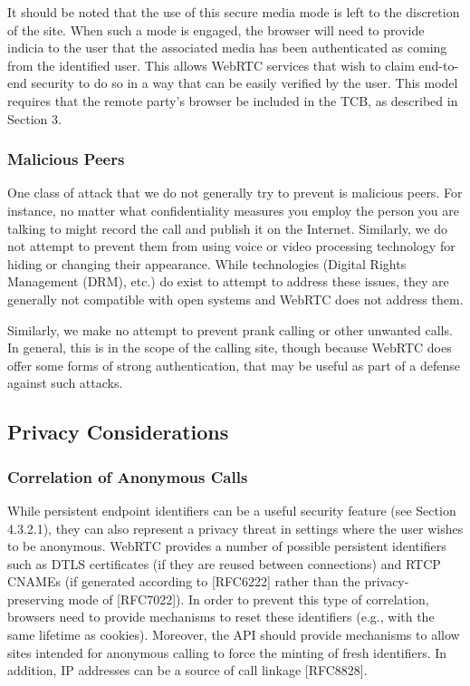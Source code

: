 \documentclass{article}
\begin{document}
It should be noted that the use of this secure media mode is left to
the discretion of the site.  When such a mode is engaged, the browser
will need to provide indicia to the user that the associated media
has been authenticated as coming from the identified user.  This
allows WebRTC services that wish to claim end-to-end security to do
so in a way that can be easily verified by the user.  This model
requires that the remote party's browser be included in the TCB, as
described in Section 3.

\subsubsection{Malicious Peers}

One class of attack that we do not generally try to prevent is
malicious peers.  For instance, no matter what confidentiality
measures you employ the person you are talking to might record the
call and publish it on the Internet.  Similarly, we do not attempt to
prevent them from using voice or video processing technology for
hiding or changing their appearance.  While technologies (Digital
Rights Management (DRM), etc.) do exist to attempt to address these
issues, they are generally not compatible with open systems and
WebRTC does not address them.

Similarly, we make no attempt to prevent prank calling or other
unwanted calls.  In general, this is in the scope of the calling
site, though because WebRTC does offer some forms of strong
authentication, that may be useful as part of a defense against such
attacks.

\subsection{Privacy Considerations}

\subsubsection{Correlation of Anonymous Calls}

While persistent endpoint identifiers can be a useful security
feature (see Section 4.3.2.1), they can also represent a privacy
threat in settings where the user wishes to be anonymous.  WebRTC
provides a number of possible persistent identifiers such as DTLS
certificates (if they are reused between connections) and RTCP CNAMEs
(if generated according to [RFC6222] rather than the privacy-preserving
mode of [RFC7022]).  In order to prevent this type of
correlation, browsers need to provide mechanisms to reset these
identifiers (e.g., with the same lifetime as cookies).  Moreover, the
API should provide mechanisms to allow sites intended for anonymous
calling to force the minting of fresh identifiers.  In addition, IP
addresses can be a source of call linkage [RFC8828].
\end{document}
